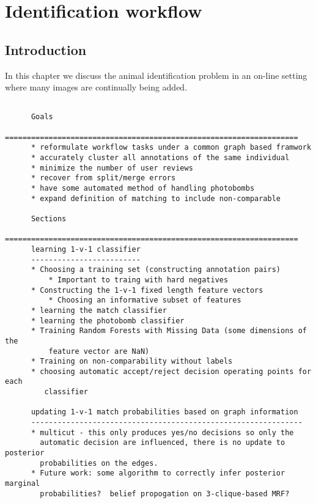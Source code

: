 \newcommand{\nNames}[0]{N}
\newcommand{\Ltop}[0]{L_{\tt{top}}}
\newcommand{\Jname}[0]{\set{J}}
\newcommand{\nAnnots}[0]{M}

\chapter{Identification workflow}

\section{Introduction}
    In this chapter we discuss the animal identification problem in an on-line setting where many images are
      continually being added.

  \begin{verbatim}

      Goals
      ===================================================================
      * reformulate workflow tasks under a common graph based framwork
      * accurately cluster all annotations of the same individual
      * minimize the number of user reviews
      * recover from split/merge errors
      * have some automated method of handling photobombs
      * expand definition of matching to include non-comparable

      Sections
      ===================================================================
      learning 1-v-1 classifier
      -------------------------
      * Choosing a training set (constructing annotation pairs)
          * Important to traing with hard negatives
      * Constructing the 1-v-1 fixed length feature vectors
          * Choosing an informative subset of features
      * learning the match classifier
      * learning the photobomb classifier
      * Training Random Forests with Missing Data (some dimensions of the
          feature vector are NaN)
      * Training on non-comparability without labels
      * choosing automatic accept/reject decision operating points for each
         classifier

      updating 1-v-1 match probabilities based on graph information
      --------------------------------------------------------------
      * multicut - this only produces yes/no decisions so only the
        automatic decision are influenced, there is no update to posterior
        probabilities on the edges.
      * Future work: some algorithm to correctly infer posterior marginal
        probabilities?  belief propogation on 3-clique-based MRF?


\end{verbatim}
